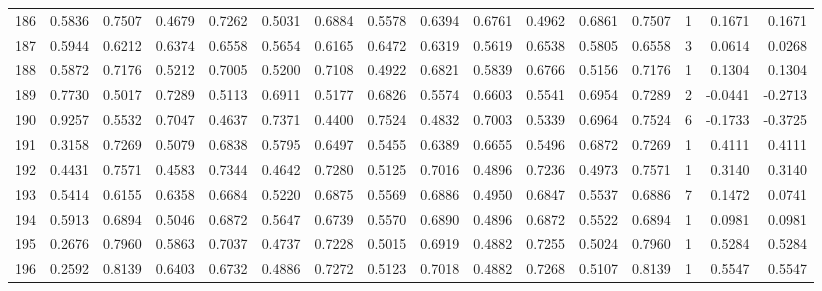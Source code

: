 \begin{tabular}{lrrrrrrrrrrrrrrr}
186 &      0.5836 &  0.7507 &  0.4679 &  0.7262 &  0.5031 &  0.6884 &  0.5578 &  0.6394 &  0.6761 &  0.4962 &   0.6861 &     0.7507 &      1 &                    0.1671 &                     0.1671 \\
187 &      0.5944 &  0.6212 &  0.6374 &  0.6558 &  0.5654 &  0.6165 &  0.6472 &  0.6319 &  0.5619 &  0.6538 &   0.5805 &     0.6558 &      3 &                    0.0614 &                     0.0268 \\
188 &      0.5872 &  0.7176 &  0.5212 &  0.7005 &  0.5200 &  0.7108 &  0.4922 &  0.6821 &  0.5839 &  0.6766 &   0.5156 &     0.7176 &      1 &                    0.1304 &                     0.1304 \\
189 &      0.7730 &  0.5017 &  0.7289 &  0.5113 &  0.6911 &  0.5177 &  0.6826 &  0.5574 &  0.6603 &  0.5541 &   0.6954 &     0.7289 &      2 &                   -0.0441 &                    -0.2713 \\
190 &      0.9257 &  0.5532 &  0.7047 &  0.4637 &  0.7371 &  0.4400 &  0.7524 &  0.4832 &  0.7003 &  0.5339 &   0.6964 &     0.7524 &      6 &                   -0.1733 &                    -0.3725 \\
191 &      0.3158 &  0.7269 &  0.5079 &  0.6838 &  0.5795 &  0.6497 &  0.5455 &  0.6389 &  0.6655 &  0.5496 &   0.6872 &     0.7269 &      1 &                    0.4111 &                     0.4111 \\
192 &      0.4431 &  0.7571 &  0.4583 &  0.7344 &  0.4642 &  0.7280 &  0.5125 &  0.7016 &  0.4896 &  0.7236 &   0.4973 &     0.7571 &      1 &                    0.3140 &                     0.3140 \\
193 &      0.5414 &  0.6155 &  0.6358 &  0.6684 &  0.5220 &  0.6875 &  0.5569 &  0.6886 &  0.4950 &  0.6847 &   0.5537 &     0.6886 &      7 &                    0.1472 &                     0.0741 \\
194 &      0.5913 &  0.6894 &  0.5046 &  0.6872 &  0.5647 &  0.6739 &  0.5570 &  0.6890 &  0.4896 &  0.6872 &   0.5522 &     0.6894 &      1 &                    0.0981 &                     0.0981 \\
195 &      0.2676 &  0.7960 &  0.5863 &  0.7037 &  0.4737 &  0.7228 &  0.5015 &  0.6919 &  0.4882 &  0.7255 &   0.5024 &     0.7960 &      1 &                    0.5284 &                     0.5284 \\
196 &      0.2592 &  0.8139 &  0.6403 &  0.6732 &  0.4886 &  0.7272 &  0.5123 &  0.7018 &  0.4882 &  0.7268 &   0.5107 &     0.8139 &      1 &                    0.5547 &                     0.5547 \\

\end{tabular}
